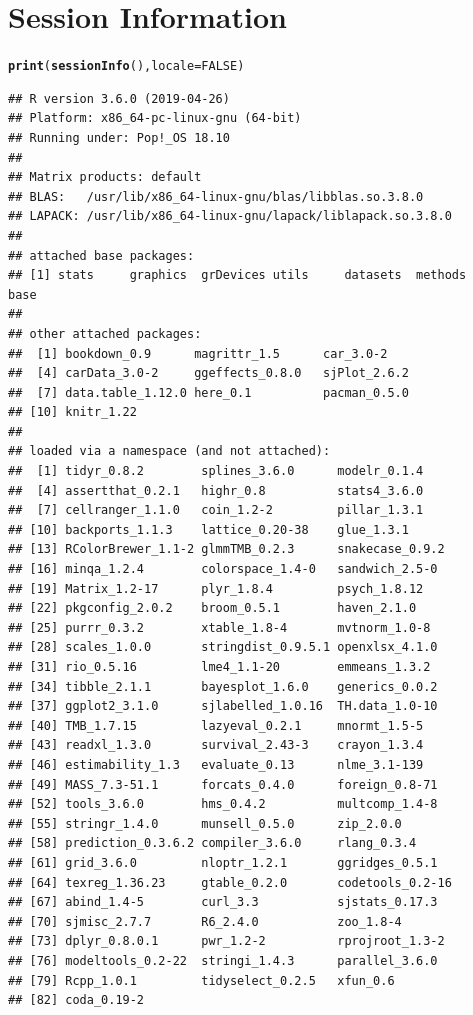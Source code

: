 \documentclass[11pt,letter]{article}\usepackage[]{graphicx}\usepackage[]{color}
\makeatletter
\newcommand{\hlnum}[1]{\textcolor[rgb]{0.686,0.059,0.569}{#1}}%
\newcommand{\hlstd}[1]{\textcolor[rgb]{0.345,0.345,0.345}{#1}}%
\newcommand{\hlkwc}[1]{\textcolor[rgb]{0.333,0.667,0.333}{#1}}%
\newcommand{\hlkwd}[1]{\textcolor[rgb]{0.737,0.353,0.396}{\textbf{#1}}}%
\newenvironment{kframe}{%
 \def\at@end@of@kframe{}%
 \ifinner\ifhmode%
  \def\at@end@of@kframe{\end{minipage}}%
  \begin{minipage}{\columnwidth}%
 \fi\fi%
 \def\FrameCommand##1{\hskip\@totalleftmargin \hskip-\fboxsep
 \colorbox{shadecolor}{##1}\hskip-\fboxsep
     \hskip-\linewidth \hskip-\@totalleftmargin \hskip\columnwidth}%
 \MakeFramed {\advance\hsize-\width
   \@totalleftmargin\z@ \linewidth\hsize
   \@setminipage}}%
 {\par\unskip\endMakeFramed%
 \at@end@of@kframe}
\newenvironment{knitrout}{}{} %
\makeatother
\begin{document}
\section{Session Information}
\begin{knitrout}
\color{fgcolor}\begin{kframe}
\begin{alltt}
\hlkwd{print}\hlstd{(}\hlkwd{sessionInfo}\hlstd{(),} \hlkwc{locale}\hlstd{=}\hlnum{FALSE}\hlstd{)}
\end{alltt}
\begin{verbatim}
## R version 3.6.0 (2019-04-26)
## Platform: x86_64-pc-linux-gnu (64-bit)
## Running under: Pop!_OS 18.10
## 
## Matrix products: default
## BLAS:   /usr/lib/x86_64-linux-gnu/blas/libblas.so.3.8.0
## LAPACK: /usr/lib/x86_64-linux-gnu/lapack/liblapack.so.3.8.0
## 
## attached base packages:
## [1] stats     graphics  grDevices utils     datasets  methods   base     
## 
## other attached packages:
##  [1] bookdown_0.9      magrittr_1.5      car_3.0-2        
##  [4] carData_3.0-2     ggeffects_0.8.0   sjPlot_2.6.2     
##  [7] data.table_1.12.0 here_0.1          pacman_0.5.0     
## [10] knitr_1.22       
## 
## loaded via a namespace (and not attached):
##  [1] tidyr_0.8.2        splines_3.6.0      modelr_0.1.4      
##  [4] assertthat_0.2.1   highr_0.8          stats4_3.6.0      
##  [7] cellranger_1.1.0   coin_1.2-2         pillar_1.3.1      
## [10] backports_1.1.3    lattice_0.20-38    glue_1.3.1        
## [13] RColorBrewer_1.1-2 glmmTMB_0.2.3      snakecase_0.9.2   
## [16] minqa_1.2.4        colorspace_1.4-0   sandwich_2.5-0    
## [19] Matrix_1.2-17      plyr_1.8.4         psych_1.8.12      
## [22] pkgconfig_2.0.2    broom_0.5.1        haven_2.1.0       
## [25] purrr_0.3.2        xtable_1.8-4       mvtnorm_1.0-8     
## [28] scales_1.0.0       stringdist_0.9.5.1 openxlsx_4.1.0    
## [31] rio_0.5.16         lme4_1.1-20        emmeans_1.3.2     
## [34] tibble_2.1.1       bayesplot_1.6.0    generics_0.0.2    
## [37] ggplot2_3.1.0      sjlabelled_1.0.16  TH.data_1.0-10    
## [40] TMB_1.7.15         lazyeval_0.2.1     mnormt_1.5-5      
## [43] readxl_1.3.0       survival_2.43-3    crayon_1.3.4      
## [46] estimability_1.3   evaluate_0.13      nlme_3.1-139      
## [49] MASS_7.3-51.1      forcats_0.4.0      foreign_0.8-71    
## [52] tools_3.6.0        hms_0.4.2          multcomp_1.4-8    
## [55] stringr_1.4.0      munsell_0.5.0      zip_2.0.0         
## [58] prediction_0.3.6.2 compiler_3.6.0     rlang_0.3.4       
## [61] grid_3.6.0         nloptr_1.2.1       ggridges_0.5.1    
## [64] texreg_1.36.23     gtable_0.2.0       codetools_0.2-16  
## [67] abind_1.4-5        curl_3.3           sjstats_0.17.3    
## [70] sjmisc_2.7.7       R6_2.4.0           zoo_1.8-4         
## [73] dplyr_0.8.0.1      pwr_1.2-2          rprojroot_1.3-2   
## [76] modeltools_0.2-22  stringi_1.4.3      parallel_3.6.0    
## [79] Rcpp_1.0.1         tidyselect_0.2.5   xfun_0.6          
## [82] coda_0.19-2
\end{verbatim}
\end{kframe}
\end{knitrout}
\end{document}
